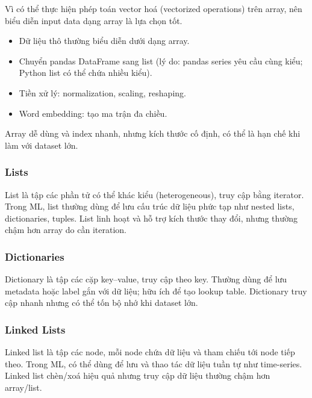 \begin{ynghia}[title={Vì sao dùng array trong ML?}]
Vì có thể thực hiện phép toán vector hoá (vectorized operations) trên array, nên biểu diễn input data dạng array là lựa chọn tốt.
\end{ynghia}

\begin{phuongphap}[title={Một số tác vụ dùng array}]
\begin{itemize}
  \item Dữ liệu thô thường biểu diễn dưới dạng array.
  \item Chuyển pandas DataFrame sang list (lý do: pandas series yêu cầu cùng kiểu; Python list có thể chứa nhiều kiểu).
  \item Tiền xử lý: normalization, scaling, reshaping.
  \item Word embedding: tạo ma trận đa chiều.
\end{itemize}
\end{phuongphap}

\begin{luuy}[title={Hạn chế của array}]
Array dễ dùng và index nhanh, nhưng kích thước cố định, có thể là hạn chế khi làm với dataset lớn.
\end{luuy}

\subsubsection{Lists}
\begin{dinhnghia}[title={Lists}]
List là tập các phần tử có thể khác kiểu (heterogeneous), truy cập bằng iterator.
Trong ML, list thường dùng để lưu cấu trúc dữ liệu phức tạp như nested lists, dictionaries, tuples.
List linh hoạt và hỗ trợ kích thước thay đổi, nhưng thường chậm hơn array do cần iteration.
\end{dinhnghia}

\subsubsection{Dictionaries}
\begin{dinhnghia}[title={Dictionaries}]
Dictionary là tập các cặp key--value, truy cập theo key.
Thường dùng để lưu metadata hoặc label gắn với dữ liệu; hữu ích để tạo lookup table.
Dictionary truy cập nhanh nhưng có thể tốn bộ nhớ khi dataset lớn.
\end{dinhnghia}

\subsubsection{Linked Lists}
\begin{dinhnghia}[title={Linked lists}]
Linked list là tập các node, mỗi node chứa dữ liệu và tham chiếu tới node tiếp theo.
Trong ML, có thể dùng để lưu và thao tác dữ liệu tuần tự như time-series.
Linked list chèn/xoá hiệu quả nhưng truy cập dữ liệu thường chậm hơn array/list.
\end{dinhnghia}


